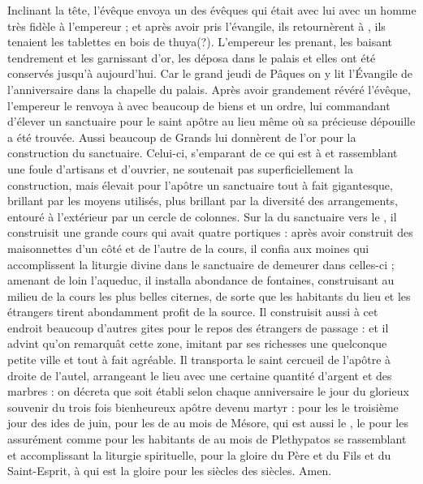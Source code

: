 Inclinant la tête, l'évêque envoya un des évêques qui était avec lui avec un homme très fidèle  à l'empereur ; et après avoir pris l'évangile, ils retournèrent à , ils tenaient les tablettes en  bois de thuya(?). L'empereur les prenant, les baisant tendrement et les garnissant d'or, les déposa dans le palais et elles ont été conservés jusqu'à aujourd'hui.
Car le grand jeudi de Pâques on y lit l'Évangile de l'anniversaire dans la chapelle du palais.
Après avoir  grandement  révéré l'évêque, l'empereur le renvoya à  avec beaucoup de biens et un ordre, lui commandant d'élever un sanctuaire pour le saint apôtre  au lieu même où sa précieuse dépouille a été trouvée.
Aussi beaucoup de Grands lui donnèrent de l'or pour la construction du sanctuaire.
Celui-ci, s'emparant de ce qui est à  et rassemblant une foule d'artisans et d'ouvrier, ne soutenait pas superficiellement la construction, mais élevait pour l'apôtre un sanctuaire tout à fait gigantesque,  brillant par les moyens utilisés, plus brillant par la diversité des arrangements, entouré à l'extérieur par un cercle de colonnes. 
Sur la  du sanctuaire vers le , il construisit une  grande cours qui avait quatre portiques :
après avoir construit  des maisonnettes d'un côté et de l'autre de la cours,  il confia aux moines qui accomplissent la liturgie divine dans le sanctuaire de demeurer dans celles-ci ;
amenant de loin  l'aqueduc,  il installa abondance de fontaines, 
construisant au milieu de la cours les plus belles citernes, de sorte que les habitants du lieu et les étrangers tirent abondamment profit de la source.
Il construisit aussi à cet endroit  beaucoup d'autres gites pour le repos des étrangers de passage : et il advint qu'on remarquât cette zone, imitant par ses richesses une quelconque  petite ville et tout à fait agréable.
Il transporta le saint cercueil de l'apôtre à droite de l'autel, arrangeant le lieu avec  une certaine quantité d'argent et des marbres : on décreta que soit établi selon chaque anniversaire le jour du glorieux souvenir du trois fois bienheureux apôtre devenu martyr  :  %
 pour les  le troisième jour des ides de juin, %
 pour les  de  au mois de Mésore, qui est aussi le , le  %
 pour les  assurément comme pour les habitants de  au mois de Plethypatos 	%
 se rassemblant et accomplissant la liturgie spirituelle,
 pour la gloire du Père et du Fils et du Saint-Esprit,  à qui est la gloire pour les siècles des siècles. Amen.
 
